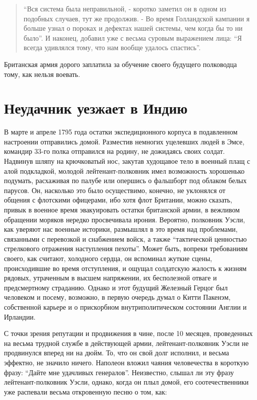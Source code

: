 \documentclass[
  oneside,
  12pt,
  titlepage]{book}
\begin{document}
\begin{quote}
``Вся система была неправильной, - коротко заметил он в одном из подобных случаев, тут же продолжив. - Во время Голландской кампании я больше узнал о пороках и дефектах нашей системы, чем когда бы то ни было''. И наконец, добавил уже с весьма суровым выражением лица: ``Я всегда удивлялся тому, что нам вообще удалось спастись''.
\end{quote}

Британская армия дорого заплатила за обучение своего будущего полководца тому, как нельзя воевать.

\hypertarget{ux43dux435ux443ux434ux430ux447ux43dux438ux43a-ux443ux435ux437ux436ux430ux435ux442-ux432-ux438ux43dux434ux438ux44e}{%
\chapter{Неудачник уезжает в Индию}\label{ux43dux435ux443ux434ux430ux447ux43dux438ux43a-ux443ux435ux437ux436ux430ux435ux442-ux432-ux438ux43dux434ux438ux44e}}

В марте и апреле 1795 года остатки экспедиционного корпуса в подавленном настроении отправились домой. Разместив немногих уцелевших людей в Эмсе, командир 33-го полка отправился на родину, не дожидаясь своих солдат. Надвинув шляпу на крючковатый нос, закутав худощавое тело в военный плащ с алой подкладкой, молодой лейтенант-полковник имел возможность хорошенько подумать, расхаживая по палубе или опершись о фальшборт под облаком белых парусов. Он, насколько это было осуществимо, конечно, не уклонялся от общения с флотскими офицерами, ибо хотя флот Британии, можно сказать, привык в военное время эвакуировать остатки британской армии, в вежливом обращении моряков нередко просвечивала ирония. Вероятно, полковник Уэсли, как уверяют нас военные историки, размышлял в это время над проблемами, связанными с перевозкой и снабжением войск, а также ``тактической ценностью стрелкового отражения наступления пехоты''. Может быть, вопреки требованиям своего, как считают, холодного сердца, он вспоминал жуткие сцены, происходившие во время отступления, и ощущал солдатскую жалость к жизням рядовых, утраченным в высшем напряжении, их бесполезной отваге и предсмертному страданию. Однако и этот будущий Железный Герцог был человеком и посему, возможно, в первую очередь думал о Китти Пакенэм, собственной карьере и о прискорбном внутриполитическом состоянии Англии и Ирландии.

С точки зрения репутации и продвижения в чине, после 10 месяцев, проведенных на весьма трудной службе в действующей армии, лейтенант-полковник Уэсли не продвинулся вперед ни на дюйм. То, что он свой долг исполнил, и весьма эффектно, не значило ничего. Наполеон вложил чаяния человечества в короткую фразу: ``Дайте мне удачливых генералов''. Неизвестно, слышал ли эту фразу лейтенант-полковник Уэсли, однако, когда он плыл домой, его соотечественники уже распевали весьма откровенную песню о том, как:
\end{document}
